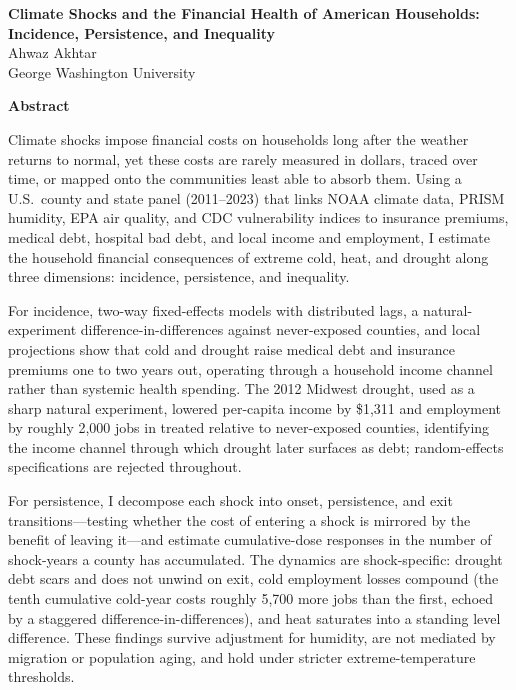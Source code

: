 \documentclass[11pt]{article}
\begin{document}
\begin{center}
  {\Large\bfseries Climate Shocks and the Financial Health of American Households:\\[0.2em]
  Incidence, Persistence, and Inequality}\\[0.8em]
  {\large Ahwaz Akhtar}\\[0.2em]
  {\normalsize George Washington University}
\end{center}

\vspace{0.8em}

\begin{center}\textbf{Abstract}\end{center}

\noindent
Climate shocks impose financial costs on households long after the weather returns to
normal, yet these costs are rarely measured in dollars, traced over time, or mapped onto
the communities least able to absorb them. Using a U.S.\ county and state panel
(2011--2023) that links NOAA climate data, PRISM humidity, EPA air quality, and CDC
vulnerability indices to insurance premiums, medical debt, hospital bad debt, and local
income and employment, I estimate the household financial consequences of extreme cold,
heat, and drought along three dimensions: incidence, persistence, and inequality.

For incidence, two-way fixed-effects models with distributed lags, a natural-experiment
difference-in-differences against never-exposed counties, and local projections show that
cold and drought raise medical debt and insurance premiums one to two years out, operating
through a household income channel rather than systemic health spending. The 2012 Midwest
drought, used as a sharp natural experiment, lowered per-capita income by \$1{,}311 and
employment by roughly 2{,}000 jobs in treated relative to never-exposed counties,
identifying the income channel through which drought later surfaces as debt; random-effects
specifications are rejected throughout.

For persistence, I decompose each shock into onset, persistence, and exit
transitions---testing whether the cost of entering a shock is mirrored by the benefit of
leaving it---and estimate cumulative-dose responses in the number of shock-years a county
has accumulated. The dynamics are shock-specific: drought debt scars and does not unwind on
exit, cold employment losses compound (the tenth cumulative cold-year costs roughly 5{,}700
more jobs than the first, echoed by a staggered difference-in-differences), and heat
saturates into a standing level difference. These findings survive adjustment for humidity,
are not mediated by migration or population aging, and hold under stricter
extreme-temperature thresholds.
\end{document}
